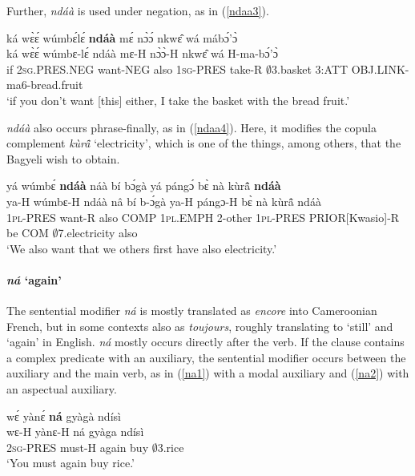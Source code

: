 \noindent Further, {\itshape ndáà} is used under negation, as in (\ref{ndaa3}). 

\begin{exe} 
\ex\label{ndaa3}
  \glll ká wɛ̀ɛ́ wúmbɛ́lɛ́ {\bfseries ndáà} mɛ́ nɔ̀ɔ́ nkwɛ̂ wá mábɔ́'ɔ̀ \\
        ká wɛ̀ɛ́ wúmbɛ-lɛ́ ndáà mɛ-H nɔ̀ɔ̀-H nkwɛ̂ wá H-ma-bɔ́'ɔ̀ \\
         if 2\textsc{sg}.PRES.NEG want-NEG also 1\textsc{sg}-PRES take-R $\emptyset$3.basket 3:ATT OBJ.LINK-ma6-bread.fruit\\
    \trans `if you don't want [this] either, I take the basket with the bread fruit.'
\end{exe}

{\itshape ndáà} also occurs phrase-finally, as in (\ref{ndaa4}). Here, it modifies the copula complement {\itshape kùrã̂} `electricity', which is one of the things, among others, that the Bagyeli wish to obtain.

\begin{exe} 
\ex\label{ndaa4} 
  \glll  yá wúmbɛ́ {\bfseries ndáà} náà bí bɔ́gà yá pángɔ́ bɛ̀ nà kùrã̂ {\bfseries ndáà} \\
         ya-H wúmbɛ-H ndáà nâ bí b-ɔ́gà ya-H pángɔ-H bɛ̀ nà kùrã̂ ndáà \\
        1\textsc{pl}-PRES want-R also COMP 1\textsc{pl}.EMPH 2-other 1\textsc{pl}-PRES  PRIOR[Kwasio]-R be  COM $\emptyset$7.electricity also\\
    \trans `We also want that we others first have also electricity.'
\end{exe}


\paragraph{{\itshape ná}  `again'}
The sentential modifier {\itshape ná} is mostly translated as {\itshape encore} into Cameroonian French, but in some contexts also as {\itshape toujours}, roughly translating to `still' and `again' in English. {\itshape ná} mostly occurs directly after the verb. If the clause contains a complex predicate with an auxiliary, the sentential modifier occurs between the auxiliary and the main verb, as in (\ref{na1}) with a modal auxiliary and (\ref{na2}) with an aspectual auxiliary.

\begin{exe} 
\ex\label{na1} 
  \glll  wɛ́ yànɛ́ {\bfseries ná} gyàgà ndísì \\
     wɛ-H yànɛ-H ná gyàga ndísì \\
        2\textsc{sg}-PRES must-H again buy $\emptyset$3.rice  \\
    \trans `You must again buy rice.'
\end{exe}

